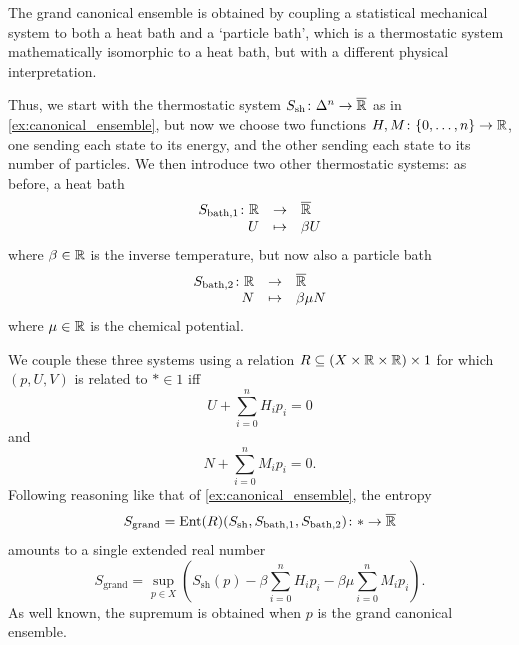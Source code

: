 \documentclass[12pt, reqno]{amsart}
\newcommand{\extreal}{\overline{\real}}
\newcommand{\Ssh}{S_{\mathrm{sh}}} %
\begin{document}
\begin{example} \label{ex:grand_canonical_ensemble}
    The grand canonical ensemble is obtained by coupling a statistical mechanical system to both a heat bath and a `particle bath', which is a thermostatic system mathematically isomorphic to a heat bath, but with a different physical interpretation. 
    
    Thus, we start with the thermostatic system $\Ssh \maps \Delta^n \to \extreal$ as in  \cref{ex:canonical_ensemble}, but now we choose two functions $H,M \colon \{0,\ldots,n\} \rightarrow \mathbb{R}$, one sending each state to its energy, and the other sending each state to its number of particles. We then introduce two other thermostatic systems: as before, a heat bath 
    \[  \begin{array}{rcl}
    S_{\mathrm{bath},1} \maps \real &\to& \extreal \\  
    U &\mapsto& \beta U 
    \end{array} \]
    where $\beta \in \mathbb{R}$ is the inverse temperature, but now also a particle bath 
    \[  \begin{array}{rcl}
    S_{\mathrm{bath},2} \maps \real &\to& \extreal \\  
    N &\mapsto& \beta \mu N 
    \end{array} \]
    where $\mu \in \mathbb{R}$ is the chemical potential.
    
    We couple these three systems using a relation $R \subseteq (X \times \mathbb{R} \times \mathbb{R}) \times 1$ for which $(p,U,V)$ is related to $\ast \in 1$ iff
    \[ U + \sum_{i=0}^n H_i p_i = 0 \]
    and
    \[ N + \sum_{i=0}^n M_i p_i = 0 .\]
    Following reasoning like that of \cref{ex:canonical_ensemble}, the entropy
    \[    S_{\mathrm{grand}} = \Ent(R)(\Ssh,S_{\rm{bath},1}, S_{\rm{bath},2}) \maps \ast \to \extreal \]
    amounts to a single extended real number
    \[ S_{\mathrm{grand}} = \sup_{p \in X} \left(\Ssh(p) - \beta \sum_{i=0}^n H_i p_i - \beta \mu \sum_{i=0}^n M_i p_i \right).\]
    As well known, the supremum is obtained when $p$ is the grand canonical ensemble. 
\end{example}
\end{document}
